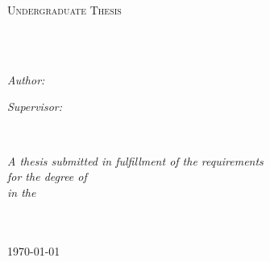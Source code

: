 \documentclass[
11pt, %
english, %
singlespacing, %
headsepline, %
chapterinoneline, %
]{MastersDoctoralThesis} %
\author{Elliott \textsc{Capek}} %
\begin{document}
\frontmatter %

\pagestyle{plain} %


\begin{titlepage}
\begin{center}

\vspace*{.06\textheight}
{\scshape\LARGE \univname\par}\vspace{1.5cm} %
\textsc{\Large Undergraduate Thesis}\\[0.5cm] %

\HRule \\[0.4cm] %
{\huge \bfseries \ttitle\par}\vspace{0.4cm} %
\HRule \\[1.5cm] %
 
\begin{minipage}[t]{0.4\textwidth}
\begin{flushleft} \large
\emph{Author:}\\
{\authorname} %
\end{flushleft}
\end{minipage}
\begin{minipage}[t]{0.4\textwidth}
\begin{flushright} \large
\emph{Supervisor:} \\
{\supname} %
\end{flushright}
\end{minipage}\\[3cm]
 
\vfill

\large \textit{A thesis submitted in fulfillment of the requirements\\ for the degree of \degreename}\\[0.3cm] %
\textit{in the}\\[0.4cm]
\groupname\\\deptname\\[2cm] %
 
\vfill

{\large \today}\\[4cm] %
 
\vfill
\end{center}
\end{titlepage}
\end{document}
